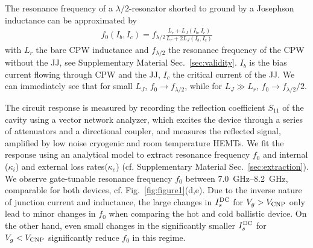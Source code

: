 The resonance frequency of a $\lambda/2$-resonator shorted to ground by a Josephson inductance can be approximated by
\begin{align}
f_0\left(I_b,I_c\right) = f_{\lambda/2} \frac{L_r+L_J\left(I_b, I_c\right)}{L_r +  2L_J\left(I_b, I_c\right)}
\label{eq:Pogorzalek}
\end{align}
%
with $L_r$ the bare CPW inductance and $f_{\lambda/2}$ the resonance frequency of the CPW without the JJ, see Supplementary Material Sec.~\ref{sec:validity}.
%
$I_b$ is the bias current flowing through CPW and the JJ, $I_c$ the critical current of the JJ.
%
We can immediately see that for small $L_J$, $f_0\rightarrow f_{\lambda/2}$, while for $L_J\gg L_r$, $f_0 \rightarrow f_{\lambda/2}/2$.

The circuit response is measured by recording the reflection coefficient $S_{11}$ of the cavity using a vector network analyzer, which excites the device through a series of attenuators and a directional coupler, and measures the reflected signal, amplified by low noise cryogenic and room temperature HEMTs. 
%
We fit the response using an analytical model to extract resonance frequency $f_0$ and internal ($\kappa_i$) and external loss rates($\kappa_e$) (cf. Supplementary Material Sec.~\ref{sec:extraction}).
%
We observe gate-tunable resonance frequency $f_0$ between \SIrange{7.0}{8.2}{\giga\hertz}, comparable for both devices, cf. Fig.~\ref{fig:figure1}(d,e).
%
Due to the inverse nature of junction current and inductance, the large changes in $I_s^{\rm DC}$ for $V_g>V_{\rm CNP}$ only lead to minor changes in $f_0$ when comparing the hot and cold ballistic device.
%
On the other hand, even small changes in the significantly smaller $I_s^{\rm DC}$ for $V_g<V_{\rm CNP}$ significantly reduce $f_0$ in this regime.

